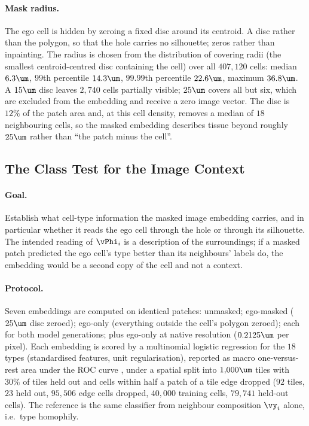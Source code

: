 \paragraph{Mask radius.}
The ego cell is hidden by zeroing a fixed disc around its centroid. A disc rather than the polygon, so that the hole carries no silhouette; zeros rather than inpainting. The radius is chosen from the distribution of covering radii (the smallest centroid-centred disc containing the cell) over all $407{,}120$ cells: median $6.3\um$, $99$th percentile $14.3\um$, $99.99$th percentile $22.6\um$, maximum $36.8\um$. A $15\um$ disc leaves $2{,}740$ cells partially visible; $25\um$ covers all but six, which are excluded from the embedding and receive a zero image vector. The disc is $12\%$ of the patch area and, at this cell density, removes a median of $18$ neighbouring cells, so the masked embedding describes tissue beyond roughly $25\um$ rather than ``the patch minus the cell''. 

\subsection{The Class Test for the Image Context}
\label{app:ego-masking}

\paragraph{Goal.} Establish what cell-type information the masked image embedding carries, and in particular whether it reads the ego cell through the hole or through its silhouette. The intended reading of $\vPhi_i$ is a description of the surroundings; if a masked patch predicted the ego cell's type better than its neighbours' labels do, the embedding would be a second copy of the cell and not a context.

\paragraph{Protocol.} Seven embeddings are computed on identical patches: unmasked; ego-masked ($25\um$ disc zeroed); ego-only (everything outside the cell's polygon zeroed); each for both model generations; plus ego-only at native resolution ($0.2125\um$ per pixel). Each embedding is scored by a multinomial logistic regression for the $18$ types (standardised features, unit regularisation), reported as macro one-versus-rest area under the ROC curve \citep{hand2001}, under a spatial split into $1{,}000\um$ tiles with $30\%$ of tiles held out and cells within half a patch of a tile edge dropped ($92$ tiles, $23$ held out, $95{,}506$ edge cells dropped, $40{,}000$ training cells, $79{,}741$ held-out cells). The reference is the same classifier from neighbour composition $\vy_i$ alone, i.e.\ type homophily.

